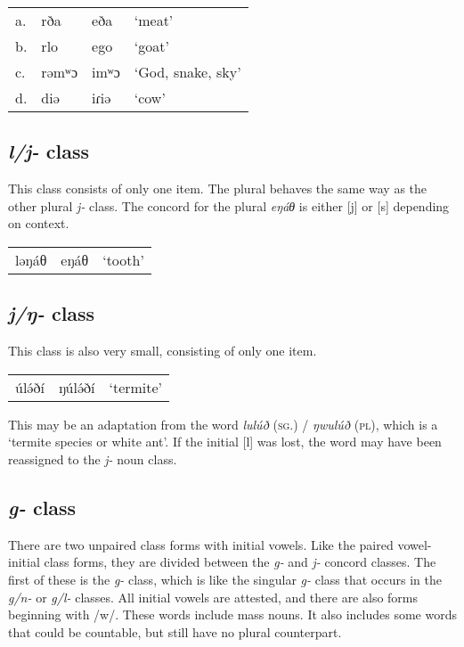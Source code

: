 \ea
\begin{tabular}[t]{llll}
a.	&	rða		&	eða		&	‘meat’\\
b.	&	rlo		&	ego		&	‘goat’\\
c.	&	rəmʷɔ	&	imʷɔ	&	‘God, snake, sky’\\
d.	&	diə		&	iɾiə	&	‘cow’\\
\end{tabular}
\z

\subsection{\textit{l/j-} class}
This class consists of only one item. The plural behaves the same way as the other plural \textit{j-} class. The concord for the plural \textit{eŋáθ} is either [j] or [s] depending on context. 

\ea	 
\begin{tabular}[t]{lll}
ləŋáθ	&	eŋáθ	&	‘tooth’ \\
\end{tabular}
\z 


\subsection{\textit{j/ŋ-} class}
This class is also very small, consisting of only one item. 

\ea	 
\begin{tabular}[t]{lll}
úlə́ðí	&	ŋúlə́ðí	&	‘termite’\\
\end{tabular}
\z 

This may be an adaptation from the word \textit{lulúð} (\textsc{sg}.) / \textit{ŋwulúð} (\textsc{pl}), which is a ‘termite species or white ant’. If the initial [l] was lost, the word may have been reassigned to the \textit{j-} noun class. 


\subsection{\textit{g-} class}
There are two unpaired class forms with initial vowels. Like the paired vowel-initial class forms, they are divided between the \textit{g-} and \textit{j-} concord classes. The first of these is the \textit{g-} class, which is like the singular \textit{g-} class that occurs in the \textit{g/n-} or \textit{g/l-} classes. All initial vowels are attested, and there are also forms beginning with /w/. These words include mass nouns. It also includes some words that could be countable, but still have no plural counterpart. 

